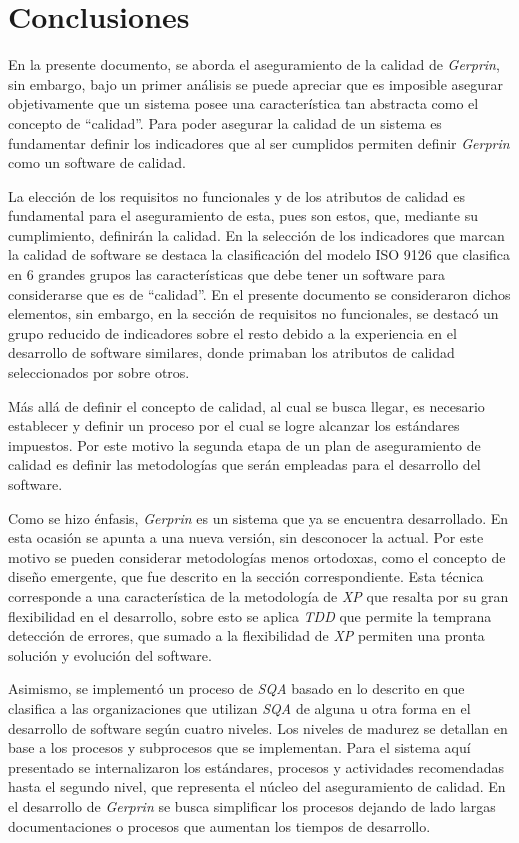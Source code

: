 
\chapter{Conclusiones }

En la presente documento, se aborda el aseguramiento de la calidad de \emph{Gerprin}, sin embargo, bajo un primer análisis se puede apreciar que es imposible asegurar objetivamente que un sistema posee una característica tan abstracta como el concepto de “calidad”. Para poder asegurar la calidad de un sistema es fundamentar definir los indicadores que al ser cumplidos permiten definir \emph{Gerprin} como un software de calidad.

La elección de los requisitos no funcionales y de los atributos de calidad es fundamental para el aseguramiento de esta, pues son estos, que, mediante su cumplimiento, definirán la calidad. En la selección de los indicadores que marcan la calidad de software se destaca la clasificación del modelo ISO 9126 que clasifica en 6 grandes grupos las características que debe tener un software para considerarse que es de “calidad”. En el presente documento se consideraron dichos elementos, sin embargo, en la sección de requisitos no funcionales, se destacó un grupo reducido de indicadores sobre el resto debido a la experiencia en el desarrollo de software similares, donde primaban los atributos de calidad seleccionados por sobre otros.

Más allá de definir el concepto de calidad, al cual se busca llegar, es necesario establecer y definir un proceso por el cual se logre alcanzar los estándares impuestos. Por este motivo la segunda etapa de un plan de aseguramiento de calidad es definir las metodologías que serán empleadas para el desarrollo del software. 

Como se hizo énfasis, \emph{Gerprin} es un sistema que ya se encuentra desarrollado. En esta ocasión se apunta a una nueva versión, sin desconocer la actual. Por este motivo se pueden considerar metodologías menos ortodoxas, como el concepto de diseño emergente, que fue descrito en la sección correspondiente. Esta técnica corresponde a una característica de la metodología de \emph{XP} que resalta por su gran flexibilidad en el desarrollo, sobre esto se aplica \emph{TDD} que permite la temprana detección de errores, que sumado a la flexibilidad de \emph{XP} permiten una pronta solución y evolución del software.

Asimismo, se implementó un proceso de \emph{SQA} basado en lo descrito en \citet{web00} que clasifica a las organizaciones que utilizan \emph{SQA} de alguna u otra forma en el desarrollo de software según cuatro niveles. Los niveles de madurez se detallan en base a los procesos y subprocesos que se implementan. Para el sistema aquí presentado se internalizaron los estándares, procesos y actividades recomendadas hasta el segundo nivel, que representa el núcleo del aseguramiento de calidad. En el desarrollo de \emph{Gerprin} se busca simplificar los procesos dejando de lado largas documentaciones o procesos que aumentan los tiempos de desarrollo. 

